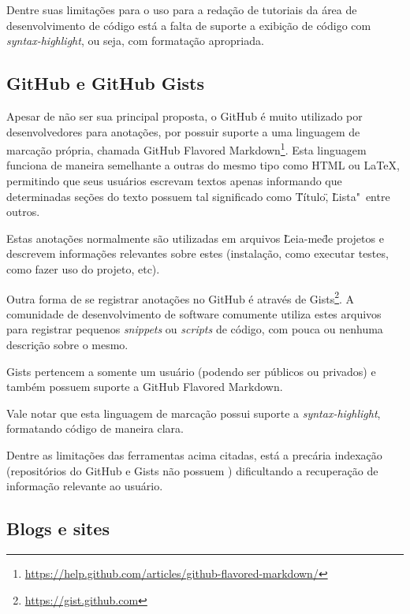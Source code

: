Dentre suas limitações para o uso para a redação de tutoriais da área de desenvolvimento de código está a falta de suporte a exibição de código com \textit{syntax-highlight}, ou seja, com formatação apropriada.


\subsection{GitHub e GitHub Gists}

Apesar de não ser sua principal proposta, o GitHub é muito utilizado por desenvolvedores para anotações, por possuir suporte a uma linguagem de marcação própria, chamada GitHub Flavored Markdown\footnote{\url{https://help.github.com/articles/github-flavored-markdown/}}. Esta linguagem funciona de maneira semelhante a outras do mesmo tipo como HTML ou LaTeX, permitindo que seus usuários escrevam textos apenas informando que determinadas seções do texto possuem tal significado como \"Título\", \"Lista"\, entre outros.

Estas anotações normalmente são utilizadas em arquivos \"Leia-me\" de projetos e descrevem informações relevantes sobre estes (instalação, como executar testes, como fazer uso do projeto, etc).


Outra forma de se registrar anotações no GitHub é através de Gists\footnote{\url{https://gist.github.com}}. A comunidade de desenvolvimento de software comumente utiliza estes arquivos para registrar pequenos \textit{snippets} ou \textit{scripts} de código, com pouca ou nenhuma descrição sobre o mesmo.

Gists pertencem a somente um usuário (podendo ser públicos ou privados) e também possuem suporte a GitHub Flavored Markdown.

Vale notar que esta linguagem de marcação possui suporte a \textit{syntax-highlight}, formatando código de maneira clara.


Dentre as limitações das ferramentas acima citadas, está a precária indexação (repositórios do GitHub e Gists não possuem ) dificultando a recuperação de informação relevante ao usuário.


\subsection{Blogs e sites}

